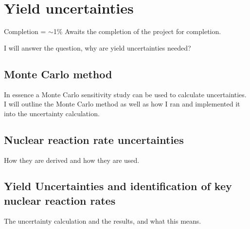 \chapter{Yield uncertainties}

Completion = $\sim$1\%
Awaits the completion of the project for completion.

I will answer the question, why are yield uncertainties needed?

\section{Monte Carlo method}

In essence a Monte Carlo sensitivity study can be used to calculate uncertainties. I will outline the Monte Carlo method as well as how I ran and implemented it into the uncertainty calculation.

\section{Nuclear reaction rate uncertainties}

How they are derived and how they are used.

\section{Yield Uncertainties and identification of key nuclear reaction rates}

The uncertainty calculation and the results, and what this means.

